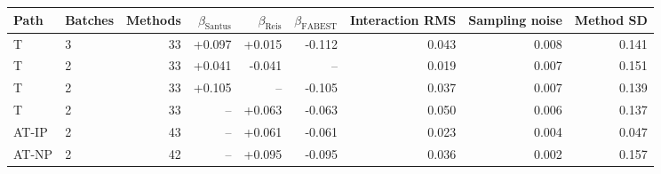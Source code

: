 \begin{tabular}{llrrrrrrr}
\hline
Path & Batches & Methods & $\beta_{\mathrm{Santus}}$ & $\beta_{\mathrm{Reis}}$ & $\beta_{\mathrm{FABEST}}$ & Interaction RMS & Sampling noise & Method SD \\
\hline
T & 3 & 33 & +0.097 & +0.015 & -0.112 & 0.043 & 0.008 & 0.141 \\
T & 2 & 33 & +0.041 & -0.041 & -- & 0.019 & 0.007 & 0.151 \\
T & 2 & 33 & +0.105 & -- & -0.105 & 0.037 & 0.007 & 0.139 \\
T & 2 & 33 & -- & +0.063 & -0.063 & 0.050 & 0.006 & 0.137 \\
AT-IP & 2 & 43 & -- & +0.061 & -0.061 & 0.023 & 0.004 & 0.047 \\
AT-NP & 2 & 42 & -- & +0.095 & -0.095 & 0.036 & 0.002 & 0.157 \\
\hline
\end{tabular}
